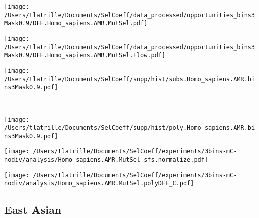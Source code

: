 \documentclass{article}
\begin{document}
    \begin{minipage}{0.32\linewidth}
        \texttt{[image: /Users/tlatrille/Documents/SelCoeff/data\_processed/opportunities\_bins3Mask0.9/DFE.Homo\_sapiens.AMR.MutSel.pdf]}
    \end{minipage}
    \begin{minipage}{0.32\linewidth}
        \texttt{[image: /Users/tlatrille/Documents/SelCoeff/data\_processed/opportunities\_bins3Mask0.9/DFE.Homo\_sapiens.AMR.MutSel.Flow.pdf]}
    \end{minipage}
    \begin{minipage}{0.32\linewidth}
        \texttt{[image: /Users/tlatrille/Documents/SelCoeff/supp/hist/subs.Homo\_sapiens.AMR.bins3Mask0.9.pdf]}
    \end{minipage}
    \\
    \begin{minipage}{0.32\linewidth}
        \texttt{[image: /Users/tlatrille/Documents/SelCoeff/supp/hist/poly.Homo\_sapiens.AMR.bins3Mask0.9.pdf]}
    \end{minipage}
    \begin{minipage}{0.32\linewidth}
        \texttt{[image: /Users/tlatrille/Documents/SelCoeff/experiments/3bins-mC-nodiv/analysis/Homo\_sapiens.AMR.MutSel-sfs.normalize.pdf]}
    \end{minipage}
    \begin{minipage}{0.32\linewidth}
        \texttt{[image: /Users/tlatrille/Documents/SelCoeff/experiments/3bins-mC-nodiv/analysis/Homo\_sapiens.AMR.MutSel.polyDFE\_C.pdf]}
    \end{minipage}
    \subsection{East Asian}
\end{document}

